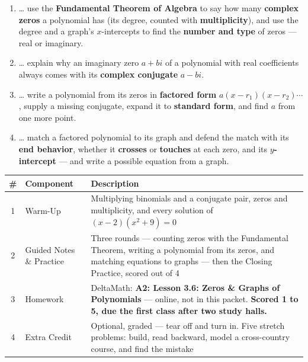 \documentclass[12pt]{article}
\begin{document}

\namedateperiod
\vspace{0.18in}

\boxguard[14]
\begin{learningtargetbox}
\small
\begin{enumerate}[leftmargin=1.5em, itemsep=5pt]
  \item \ldots{} use the \textbf{Fundamental Theorem of Algebra} to say how many
        \textbf{complex zeros} a polynomial has (its degree, counted with
        \textbf{multiplicity}), and use the degree and a graph's $x$-intercepts to find the
        \textbf{number and type} of zeros --- real or imaginary.
  \item \ldots{} explain why an imaginary zero $a+bi$ of a polynomial with real coefficients
        always comes with its \textbf{complex conjugate} $a-bi$.
  \item \ldots{} write a polynomial from its zeros in \textbf{factored form}
        $a(x-r_1)(x-r_2)\cdots$, supply a missing conjugate, expand it to
        \textbf{standard form}, and find $a$ from one more point.
  \item \ldots{} match a factored polynomial to its graph and defend the match with its
        \textbf{end behavior}, whether it \textbf{crosses} or \textbf{touches} at each zero,
        and its \textbf{$y$-intercept} --- and write a possible equation from a graph.
\end{enumerate}
\end{learningtargetbox}

\vspace{0.14in}

\boxguard[14]
\begin{tocbox}
\small
\renewcommand{\arraystretch}{1.5}
\begin{tabularx}{\linewidth}{@{} c l X @{}}
\rowcolor{forestbg}
\textbf{\#} & \textbf{Component} & \textbf{Description} \\
\midrule
1 & Warm-Up & Multiplying binomials and a conjugate pair, zeros and multiplicity, and every
              solution of $(x-2)(x^2+9)=0$ \\
2 & Guided Notes \& Practice & Three rounds --- counting zeros with the Fundamental Theorem,
              writing a polynomial from its zeros, and matching equations to graphs --- then the
              Closing Practice, scored out of 4 \\
3 & Homework & DeltaMath: \textbf{A2: Lesson 3.6: Zeros \& Graphs of Polynomials} --- online, not
              in this packet. \textbf{Scored 1 to 5, due the first class after two study halls.} \\
4 & Extra Credit & Optional, graded --- tear off and turn in. Five stretch problems: build,
              read backward, model a cross-country course, and find the mistake \\
\end{tabularx}
\end{tocbox}
\end{document}
